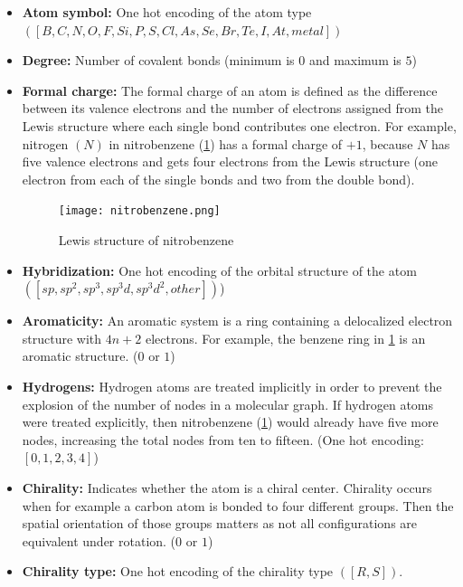 \begin{itemize}
    \item \textbf{Atom symbol:} One hot encoding of the atom type \\
        $\left( [B, C, N, O, F, Si, P, S, Cl, As, Se, Br, Te, I, At, metal] \right)$
    \item \textbf{Degree:} Number of covalent bonds (minimum is $0$ and maximum is $5$)
    \item \textbf{Formal charge:}\cite{parkin2006valence} The formal charge of an atom is defined as the difference between its valence 
        electrons and the number of electrons assigned from the Lewis structure where each single bond 
        contributes one electron. For example, nitrogen $(N)$ in nitrobenzene (\cref{fig:nitrobenzene})
        has a formal charge of $+1$, because $N$ has five valence electrons and gets four electrons 
        from the Lewis structure (one electron from each of the single bonds and two from the double bond).

        \begin{figure}[h]
            \centering
            \texttt{[image: nitrobenzene.png]}
            \caption{Lewis structure of nitrobenzene}
            \label{fig:nitrobenzene}
        \end{figure}

    \item \textbf{Hybridization:}\cite{alabugin2015orbital} One hot encoding of the orbital structure of the atom \\
        $\left([sp, sp^2, sp^3, sp^3d, sp^3d^2, other]\right)$)

    \item \textbf{Aromaticity:} An aromatic system is a ring containing a delocalized electron 
        structure with $4n + 2$ electrons. For example, the benzene ring in \cref{fig:nitrobenzene}
        is an aromatic structure. ($0$ or $1$)

    \item \textbf{Hydrogens:} Hydrogen atoms are treated implicitly in order to prevent the
        explosion of the number of nodes in a molecular graph. If hydrogen atoms 
        were treated explicitly, then nitrobenzene (\cref{fig:nitrobenzene}) would 
        already have five more nodes, increasing the total nodes from ten to fifteen.
        (One hot encoding: $[0, 1, 2, 3, 4]$)

    \item \textbf{Chirality:}\cite{prelog1976chirality} Indicates whether the atom is a chiral center. Chirality 
        occurs when for example a carbon atom is bonded to four different groups. 
        Then the spatial orientation of those groups matters as not all configurations 
        are equivalent under rotation. ($0$ or $1$)

    \item \textbf{Chirality type:} One hot encoding of the chirality type $([R, S])$.

\end{itemize}


